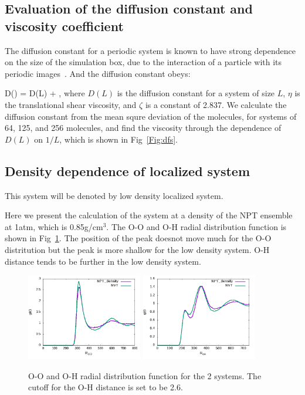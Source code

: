 \documentclass[prl,twocolumn,showpacs]{revtex4}
\begin{document}
\subsection{Evaluation of the diffusion constant and viscosity coefficient} 

The diffusion constant for a periodic system is known to have strong dependence on the size of the simulation box, due to the interaction of a particle with its periodic images~\cite{dunweg1993molecular}. And the diffusion constant obeys:

\bea
D(\infty) = D(L) + ,
\eea
where $D(L)$ is the diffusion constant for a system of size $L$, $\eta$ is the translational shear viscosity, and $\zeta$ is a constant of 2.837. We calculate the diffusion constant from the mean squre deviation of the molecules, for systems of 64, 125, and 256 molecules, and find the viscosity through the dependence of $D(L)$ on $1/L$, which is shown in Fig~\ref{Fig:dfs}. 

\subsection{Density dependence of localized system} 

This system will be denoted by low density localized system.

Here we present the calculation of the system at a density of the NPT ensemble at 1atm, which is 0.85g/cm$^3$. The O-O and O-H radial distribution function is shown in Fig~\ref{Fig:rdf_cp}. The position of the peak doesnot move much for the O-O distritution but the peak is more shallow for the low density system. O-H distance tends to be further in the low density system.

\begin{figure}
\includegraphics[width=0.45\textwidth]{rdf_NVT_CPDNVT}
\includegraphics[width=0.45\textwidth]{rdf_OH_NVT_CPDNPT}
\caption{O-O and O-H radial distribution function for the 2 systems. The cutoff for the O-H distance is set to be 2.6\Ang.}\label{Fig:rdf_cp}
\end{figure} 
\end{document}
